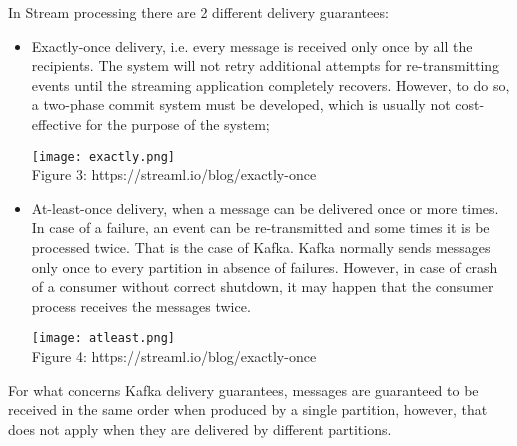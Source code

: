 \documentclass[]{report}
\begin{document}
\begin{enumerate}
 In Stream processing there are 2 different delivery guarantees:
 \begin{itemize}
     \item Exactly-once delivery, i.e. every message is received only once by all the recipients. The system will not retry additional attempts for re-transmitting events until the streaming application completely recovers. However, to do so, a two-phase commit system must be developed, which is usually not cost-effective for the purpose of the system;
     
    \begin{center}
  \texttt{[image: exactly.png]}\\
  Figure 3: https://streaml.io/blog/exactly-once
\end{center}

    \item At-least-once delivery, when a message can be delivered once or more times. In case of a failure, an event can be re-transmitted and some times it is be processed twice. That is the case of Kafka. Kafka normally sends messages only once to every partition in absence of failures. However, in case of crash of a consumer without correct shutdown, it may happen that the consumer process receives the messages twice.
    
    \begin{center}
  \texttt{[image: atleast.png]}\\
  Figure 4: https://streaml.io/blog/exactly-once
\end{center}
 \end{itemize}
 For what concerns Kafka delivery guarantees, messages are guaranteed to be received in the same order when produced by a single partition, however, that does not apply when they are delivered by different partitions.
\end{enumerate}
\end{document}
